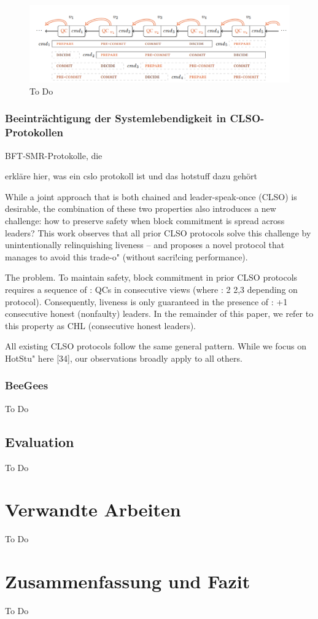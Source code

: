 \documentclass[nonacm,sigconf,natbib=false]{acmart}
\begin{document}
\begin{figure}
  \centering
  \includegraphics[width=\linewidth]{chained-hotstuff.png}
  \caption{To Do}
  \label{fig:chained-hotstuff}
\end{figure}

\subsubsection{Beeinträchtigung der Systemlebendigkeit in CLSO-Protokollen}

BFT-SMR-Protokolle, die

erkläre hier, was ein cslo protokoll ist und das hotstuff dazu gehört

While a joint approach that is both chained and leader-speak-once (CLSO) is desirable, the combination of these two properties also introduces a new challenge: how to preserve safety when block commitment is spread across leaders? This work observes that all prior CLSO protocols solve this challenge by unintentionally relinquishing liveness – and proposes a novel protocol that manages to avoid this trade-o" (without sacri!cing performance).


The problem. To maintain safety, block commitment in prior CLSO protocols requires a sequence of : QCs in consecutive views (where : 2 {2,3} depending on protocol). Consequently, liveness is only guaranteed in the presence of : +1 consecutive honest (nonfaulty) leaders. In the remainder of this paper, we refer to this property as CHL (consecutive honest leaders).


All existing CLSO protocols follow the same general pattern. While we focus on HotStu" here [34], our observations broadly apply to all others.



\subsubsection{BeeGees}

To Do

\subsection{Evaluation}

To Do

\section{Verwandte Arbeiten}

To Do

\section{Zusammenfassung und Fazit}

To Do


\printbibliography
\end{document}
